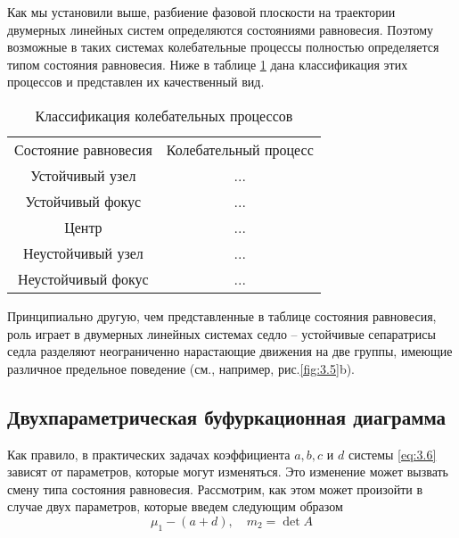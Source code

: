 Как мы установили выше, разбиение фазовой плоскости на траектории
двумерных линейных систем определяются состояниями равновесия. Поэтому
возможные в таких системах колебательные процессы полностью определяется
типом состояния равновесия. Ниже в таблице \ref{tab:1} дана классификация этих
процессов и представлен их качественный вид.
\begin{table}[h!]
        \centering
        \caption{Классификация колебательных процессов}
        \label{tab:1}
        \begin{tabular}{c|c}
            Состояние равновесия & Колебательный процесс \\
            Устойчивый узел     & ...\\
            Устойчивый фокус & ...\\
            Центр & ...\\
            Неустойчивый узел &  ...\\
            Неустойчивый фокус & ... \\
        \end{tabular}
\end{table}
Принципиально другую, чем представленные в таблице состояния равновесия,
роль играет в двумерных линейных системах седло – устойчивые сепаратрисы
седла разделяют неограниченно нарастающие движения на две группы,
имеющие различное предельное поведение (см., например, рис.\ref{fig:3.5}b). 

\subsection{Двухпараметрическая буфуркационная диаграмма}%
\label{ssub:3.2.4}

Как правило, в практических задачах коэффициента $a, b ,c$ и $d$ системы
\eqref{eq:3.6} зависят от параметров, которые могут изменяться. Это изменение может вызвать смену типа состояния равновесия. Рассмотрим, как этом может произойти в случае двух параметров, которые введем следующим образом
\begin{equation}
        \label{eq:}
        \mu_1 - (a+d), \quad m_2= \det A
\end{equation}

